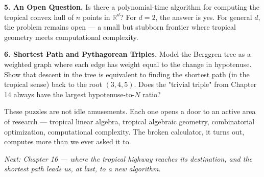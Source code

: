 \textbf{5. An Open Question.} Is there a polynomial-time algorithm for computing the tropical convex hull of $n$ points in $\mathbb{R}^d$? For $d = 2$, the answer is yes. For general $d$, the problem remains open --- a small but stubborn frontier where tropical geometry meets computational complexity.

\textbf{6. Shortest Path and Pythagorean Triples.} Model the Berggren tree as a weighted graph where each edge has weight equal to the change in hypotenuse. Show that descent in the tree is equivalent to finding the shortest path (in the tropical sense) back to the root $(3, 4, 5)$. Does the "trivial triple" from Chapter 14 always have the largest hypotenuse-to-$N$ ratio?

These puzzles are not idle amusements. Each one opens a door to an active area of research --- tropical linear algebra, tropical algebraic geometry, combinatorial optimization, computational complexity. The broken calculator, it turns out, computes more than we ever asked it to.


\ornbreak


\textit{Next: Chapter 16 --- where the tropical highway reaches its destination, and the shortest path leads us, at last, to a new algorithm.}

